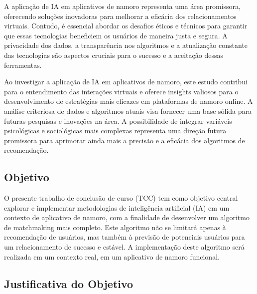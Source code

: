 A aplicação de IA em aplicativos de namoro representa uma área promissora, oferecendo soluções inovadoras para melhorar a eficácia dos relacionamentos virtuais. Contudo, é essencial abordar os desafios éticos e técnicos para garantir que essas tecnologias beneficiem os usuários de maneira justa e segura. A privacidade dos dados, a transparência nos algoritmos e a atualização constante das tecnologias são aspectos cruciais para o sucesso e a aceitação dessas ferramentas.

Ao investigar a aplicação de IA em aplicativos de namoro, este estudo contribui para o entendimento das interações virtuais e oferece insights valiosos para o desenvolvimento de estratégias mais eficazes em plataformas de namoro online. A análise criteriosa de dados e algoritmos atuais visa fornecer uma base sólida para futuras pesquisas e inovações na área. A possibilidade de integrar variáveis psicológicas e sociológicas mais complexas representa uma direção futura promissora para aprimorar ainda mais a precisão e a eficácia dos algoritmos de recomendação.
\subsection{Objetivo}
O presente trabalho de conclusão de curso (TCC) tem como objetivo central explorar e implementar metodologias de inteligência artificial (IA) em um contexto de aplicativo de namoro, com a finalidade de desenvolver um algoritmo de matchmaking mais completo. Este algoritmo não se limitará apenas à recomendação de usuários, mas também à previsão de potenciais usuários para um relacionamento de sucesso e estável. A implementação deste algoritmo será realizada em um contexto real, em um aplicativo de namoro funcional.

\subsection*{Justificativa do Objetivo}

